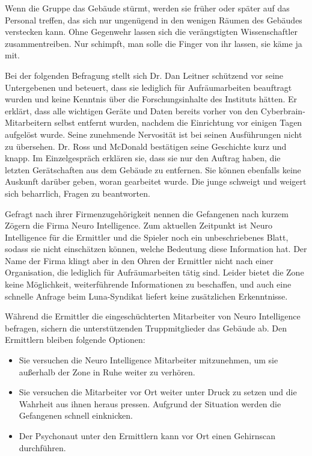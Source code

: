 Wenn die Gruppe das Gebäude stürmt, werden sie früher oder später auf das Personal treffen, das sich nur ungenügend in den wenigen Räumen des Gebäudes verstecken kann. Ohne Gegenwehr lassen sich die verängstigten Wissenschaftler zusammentreiben. Nur \ml{} schimpft, man solle die Finger von ihr lassen, sie käme ja mit.

Bei der folgenden Befragung stellt sich Dr. Dan Leitner schützend vor seine Untergebenen und beteuert, dass sie lediglich für Aufräumarbeiten beauftragt wurden und keine Kenntnis über die Forschungsinhalte des Instituts hätten. Er erklärt, dass alle wichtigen Geräte und Daten bereits vorher von den Cyberbrain-Mitarbeitern selbst entfernt wurden, nachdem die Einrichtung vor einigen Tagen aufgelöst wurde. Seine zunehmende Nervosität ist bei seinen Ausführungen nicht zu übersehen. Dr. Ross und McDonald bestätigen seine Geschichte kurz und knapp. Im Einzelgespräch erklären sie, dass sie nur den Auftrag haben, die letzten Gerätschaften aus dem Gebäude zu entfernen. Sie können ebenfalls keine Auskunft darüber geben, woran gearbeitet wurde. Die junge \ml{} schweigt und weigert sich beharrlich, Fragen zu beantworten.

Gefragt nach ihrer Firmenzugehörigkeit nennen die Gefangenen nach kurzem Zögern die Firma Neuro Intelligence. Zum aktuellen Zeitpunkt ist Neuro Intelligence für die Ermittler und die Spieler noch ein unbeschriebenes Blatt, sodass sie nicht einschätzen können, welche Bedeutung diese Information hat. Der Name der Firma klingt aber in den Ohren der Ermittler nicht nach einer Organisation, die lediglich für Aufräumarbeiten tätig sind. Leider bietet die Zone keine Möglichkeit, weiterführende Informationen zu beschaffen, und auch eine schnelle Anfrage beim Luna-Syndikat liefert keine zusätzlichen Erkenntnisse.

Während die Ermittler die eingeschüchterten Mitarbeiter von Neuro Intelligence befragen, sichern die unterstützenden Truppmitglieder das Gebäude ab. Den Ermittlern bleiben folgende Optionen:

\begin{itemize}
	\item Sie versuchen die Neuro Intelligence Mitarbeiter mitzunehmen, um sie außerhalb der Zone in Ruhe weiter zu verhören.
	\item Sie versuchen die Mitarbeiter vor Ort weiter unter Druck zu setzen und die Wahrheit aus ihnen heraus pressen. Aufgrund 
		der Situation werden die Gefangenen schnell einknicken.
	\item Der Psychonaut unter den Ermittlern kann vor Ort einen Gehirnscan durchführen.
\end{itemize}

